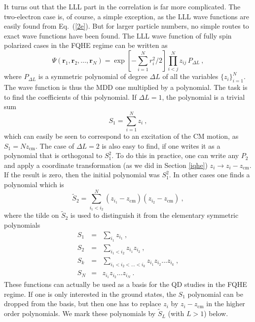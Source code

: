 \documentclass{article}
\begin{document}
It turns out that the LLL part in the correlation is far more
complicated. The two-electron case is, of course, a simple exception,
as the LLL wave functions are easily found from Eq.~(\ref{2e}).  But
for larger particle numbers, no simple routes to exact wave functions
have been found.  The LLL wave function of fully spin polarized cases
in the FQHE regime can be written as
\begin{equation}
\Psi(\mathbf{r}_1,\mathbf{r}_2,\dots,\mathbf{r}_N) =
\exp\left[-\sum_{i=1}^N r_i^2/2\right] \prod_{i<j}^N z_{ij} \, P_{\Delta L} \ ,
\label{PsiP}
\end{equation}
where $P_{\Delta L}$ is a symmetric polynomial of degree $\Delta L$ of
all the variables $\{z_i\}_{i=1}^N$.  The wave function is thus the
MDD one multiplied by a polynomial.  The task is to find the
coefficients of this polynomial.  If $\Delta L=1$, the polynomial is a
trivial sum
\begin{equation}
S_1=\sum_{i=1}^N z_i \ ,
\end{equation}
which can easily be seen to correspond to an excitation of the CM
motion, as $S_1=N z_{\mathrm{cm}}$. The case of $\Delta L = 2$ is also
easy to find, if one writes it as a polynomial that is orthogonal to
$S_1^2$. To do this in practice, one can write any $P_2$ and apply a
coordinate transformation (as we did in Section \ref{iqhe}) $z_i
\rightarrow z_i- z_{\mathrm{cm}}$. If the result is zero, then the
initial polynomial was $S_1^2$. In other cases one finds a polynomial
which is
\begin{equation}
\tilde S_2 = \sum_{i_1<i_2}^N (z_{i_1}-z_{\mathrm{cm}})
(z_{i_2}-z_{\mathrm{cm}}) \ ,
\end{equation}
where the tilde on $\tilde S_2$ is used to distinguish it from the
elementary symmetric polynomials
\begin{eqnarray}
S_1 &=& \sum_{i_1} z_{i_1} \ , \nonumber \\
S_2 &=& \sum_{i_1<i_2} z_{i_1} z_{i_2} \ , \nonumber \\
S_k &=& \sum_{i_1<i_2<\dots<i_k} z_{i_1} z_{i_2} \dots
         z_{i_k} \ ,\\ \label{lllbasis}
S_N &=& z_{i_1} z_{i_2} \dots z_{i_N} \ . \nonumber
\end{eqnarray}
These functions can actually be used as a basis for the QD studies in
the FQHE regime\cite{StabilityMDD,MCD}. If one is only interested in
the ground states, the $S_1$ polynomial can be dropped from the basis,
but then one has to replace $z_i$ by $z_i- z_{\mathrm{cm}}$ in the
higher order polynomials. We mark these polynomials by $\tilde S_L$
(with $L>1$) below.
\end{document}
